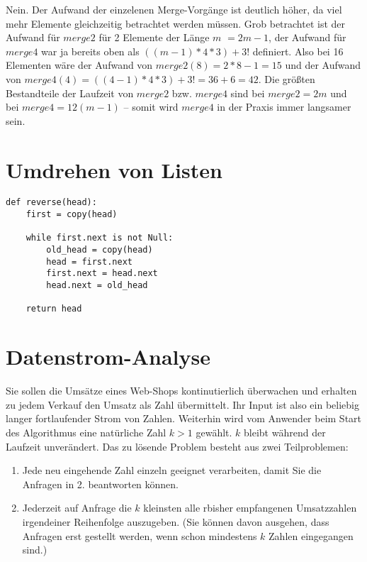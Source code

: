 \documentclass{article}
\begin{document}
Nein. Der Aufwand der einzelenen Merge-Vorgänge ist deutlich höher, da viel mehr
Elemente gleichzeitig betrachtet werden müssen. Grob betrachtet ist der Aufwand
für $merge2$ für 2 Elemente der Länge $m$ $= 2m - 1$, der Aufwand für $merge4$
war ja bereits oben als $((m - 1) * 4 * 3) + 3!$ definiert. Also bei 16
Elementen wäre der Aufwand von $merge2(8) = 2 * 8 - 1 = 15$ und der Aufwand von
$merge4(4) = ((4 - 1) * 4 * 3) + 3! = 36 + 6 = 42$.  Die größten Bestandteile
der Laufzeit von $merge2$ bzw. $merge4$ sind bei $merge2 = 2m$ und bei $merge4
= 12(m - 1)$ – somit wird $merge4$ in der Praxis immer langsamer sein.

\newpage

\section{Umdrehen von Listen}

\begin{lstlisting}
def reverse(head):
    first = copy(head)

    while first.next is not Null:
        old_head = copy(head)
        head = first.next
        first.next = head.next
        head.next = old_head

    return head
\end{lstlisting}


\section{Datenstrom-Analyse}
Sie sollen die Umsätze eines Web-Shops kontinutierlich überwachen und erhalten
zu jedem Verkauf den Umsatz als Zahl übermittelt. Ihr Input ist also ein
beliebig langer fortlaufender Strom von Zahlen. Weiterhin wird vom Anwender
beim Start des Algorithmus eine natürliche Zahl $k > 1$ gewählt. $k$ bleibt
während der Laufzeit unverändert. Das zu lösende Problem besteht aus zwei
Teilproblemen:

\begin{enumerate}
	\item{Jede neu eingehende Zahl einzeln geeignet verarbeiten,
		damit Sie die Anfragen in 2. beantworten können.}
	\item{Jederzeit auf Anfrage die $k$ kleinsten alle rbisher empfangenen
		Umsatzzahlen irgendeiner Reihenfolge auszugeben. (Sie können davon
		ausgehen, dass Anfragen erst gestellt werden, wenn schon mindestens $k$
		Zahlen eingegangen sind.)}
\end{enumerate}
\end{document}
